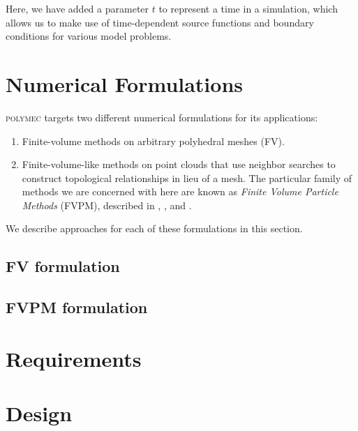 \documentclass[12pt]{article}
\newcommand{\labelSec}[1]{\label{sec:#1}}
\newcommand{\polymec}{\textsc{polymec} }
\begin{document}
\noindent
Here, we have added a parameter $t$ to represent a time in a simulation, which allows us to 
make use of time-dependent source functions and boundary conditions for various model problems. 

\section{Numerical Formulations}\labelSec{Numerics}

\polymec targets two different numerical formulations for its applications:

\begin{enumerate}
 \item Finite-volume methods on arbitrary polyhedral meshes (FV).
 \item Finite-volume-like methods on point clouds that use neighbor searches 
       to construct topological relationships in lieu of a mesh. The particular 
       family of methods we are concerned with here are known as {\em Finite Volume Particle Methods} (FVPM), 
       described in \cite{Hietel2000}, \cite{Teleaga2005}, and \cite{Nestor2009}.
\end{enumerate}

\noindent
We describe approaches for each of these formulations in this section.

\subsection{FV formulation}

\subsection{FVPM formulation}

\section{Requirements}\labelSec{Requirements}

\section{Design}\labelSec{Design}



\end{document}
